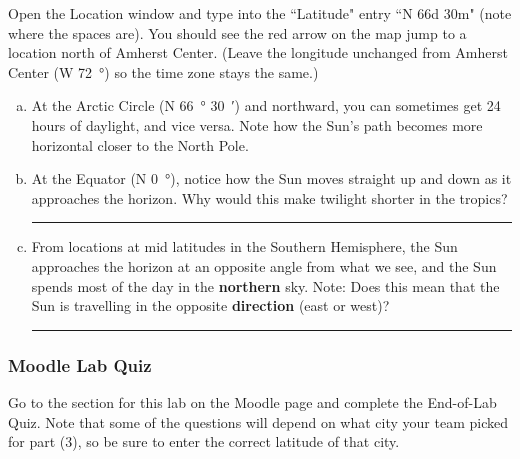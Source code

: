 \documentclass[main.tex]{subfiles}
\begin{document}
Open the Location window and type into the ``Latitude" entry ``N 66d 30m" (note where the spaces are). You should see the red arrow on the map jump to a location north of Amherst Center. (Leave the longitude unchanged from Amherst Center (W \SI{72}{\degree}) so the time zone stays the same.)
\begin{enumerate} [a.]
\item At the Arctic Circle (N \SI{66}{\degree} \SI{30}{\arcminute}) and northward, you can sometimes get 24 hours of daylight, and vice versa. Note how the Sun's path becomes more horizontal closer to the North Pole.

\item At the Equator (N \SI{0}{\degree}), notice how the Sun moves straight up and down as it approaches the horizon. Why would this make twilight shorter in the tropics?\\

\rule{15cm}{.2mm}


\item From locations at mid latitudes in the Southern Hemisphere, the Sun approaches the horizon at an opposite angle from what we see, and the Sun spends most of the day in the \textbf{northern} sky. Note: Does this mean that the Sun is travelling in the opposite \textbf{direction} (east or west)?\\

\rule{15cm}{.2mm}

\end{enumerate}

\subsubsection{Moodle Lab Quiz}
Go to the section for this lab on the Moodle page and complete the End-of-Lab Quiz. Note that some of the questions will depend on what city your team picked for part (3), so be sure to enter the correct latitude of that city.

\end{document}
